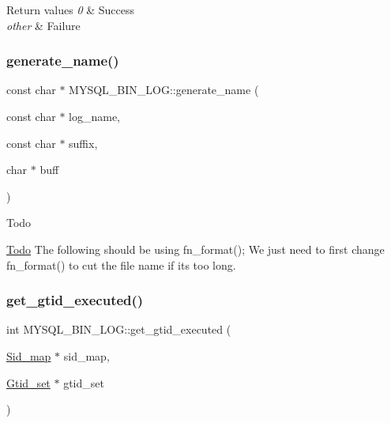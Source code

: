 \begin{DoxyRetVals}{Return values}
{\em 0} & Success \\
\hline
{\em other} & Failure \\
\hline
\end{DoxyRetVals}
\mbox{\label{group__Binary__Log_gabcd5b380680e537bdec0f093a8f2e3d6}} 
\subsubsection{\texorpdfstring{generate\+\_\+name()}{generate\_name()}}
{\footnotesize\ttfamily const char $\ast$ M\+Y\+S\+Q\+L\+\_\+\+B\+I\+N\+\_\+\+L\+O\+G\+::generate\+\_\+name (\begin{DoxyParamCaption}\item[{const char $\ast$}]{log\+\_\+name,  }\item[{const char $\ast$}]{suffix,  }\item[{char $\ast$}]{buff }\end{DoxyParamCaption})}

\begin{DoxyRefDesc}{Todo}
\item[\mbox{\hyperlink{todo__todo000005}{Todo}}]The following should be using fn\+\_\+format(); We just need to first change fn\+\_\+format() to cut the file name if it\textquotesingle{}s too long. \end{DoxyRefDesc}
\mbox{\label{group__Binary__Log_ga8d92fa178d27467ce506c759c5d82959}} 
\subsubsection{\texorpdfstring{get\+\_\+gtid\+\_\+executed()}{get\_gtid\_executed()}}
{\footnotesize\ttfamily int M\+Y\+S\+Q\+L\+\_\+\+B\+I\+N\+\_\+\+L\+O\+G\+::get\+\_\+gtid\+\_\+executed (\begin{DoxyParamCaption}\item[{\mbox{\hyperlink{classSid__map}{Sid\+\_\+map}} $\ast$}]{sid\+\_\+map,  }\item[{\mbox{\hyperlink{classGtid__set}{Gtid\+\_\+set}} $\ast$}]{gtid\+\_\+set }\end{DoxyParamCaption})}

